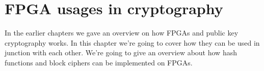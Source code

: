 \chapter{FPGA usages in cryptography\label{FPGA_crypto}}
In the earlier chapters we gave an overview on how FPGAs and public key
cryptography works. In this chapter we're going to cover how they can be used
in junction with each other. We're going to give an overview about how hash
functions and block ciphers can be implemented on FPGAs.

